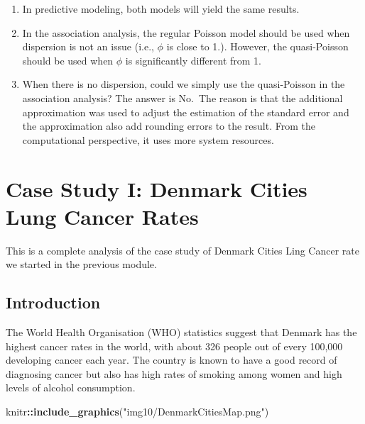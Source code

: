 \documentclass[
]{book}
\newenvironment{Shaded}{\begin{snugshade}}{\end{snugshade}}
\newcommand{\FunctionTok}[1]{\textcolor[rgb]{0.13,0.29,0.53}{\textbf{#1}}}
\newcommand{\NormalTok}[1]{#1}
\newcommand{\SpecialCharTok}[1]{\textcolor[rgb]{0.81,0.36,0.00}{\textbf{#1}}}
\newcommand{\StringTok}[1]{\textcolor[rgb]{0.31,0.60,0.02}{#1}}
\providecommand{\tightlist}{%
  \setlength{\itemsep}{0pt}\setlength{\parskip}{0pt}}
\begin{document}
\begin{itemize}
  \begin{enumerate}
  \def\labelenumi{\arabic{enumi}.}
  \tightlist
  \item
    In predictive modeling, both models will yield the same results.
  \item
    In the association analysis, the regular Poisson model should be used when dispersion is not an issue (i.e., \(\phi\) is close to 1.). However, the quasi-Poisson should be used when \(\phi\) is significantly different from 1.
  \item
    When there is no dispersion, could we simply use the quasi-Poisson in the association analysis? The answer is No.~The reason is that the additional approximation was used to adjust the estimation of the standard error and the approximation also add rounding errors to the result. From the computational perspective, it uses more system resources.
  \end{enumerate}
\end{itemize}

\hfill\break

\hypertarget{case-study-i-denmark-cities-lung-cancer-rates}{%
\section{Case Study I: Denmark Cities Lung Cancer Rates}\label{case-study-i-denmark-cities-lung-cancer-rates}}

This is a complete analysis of the case study of Denmark Cities Ling Cancer rate we started in the previous module.

\hypertarget{introduction-1}{%
\subsection{Introduction}\label{introduction-1}}

The World Health Organisation (WHO) statistics suggest that Denmark has the highest cancer rates in the world, with about 326 people out of every 100,000 developing cancer each year. The country is known to have a good record of diagnosing cancer but also has high rates of smoking among women and high levels of alcohol consumption.

\begin{Shaded}
\begin{Highlighting}[]
\NormalTok{knitr}\SpecialCharTok{::}\FunctionTok{include\_graphics}\NormalTok{(}\StringTok{"img10/DenmarkCitiesMap.png"}\NormalTok{)}
\end{Highlighting}
\end{Shaded}
\end{document}
